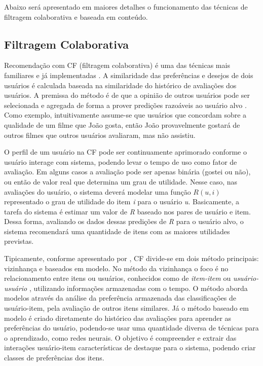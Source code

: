 Abaixo será apresentado em maiores detalhes o funcionamento das técnicas de filtragem colaborativa e baseada em conteúdo.

\subsection{Filtragem Colaborativa}

Recomendação com CF (filtragem colaborativa) é uma das técnicas mais familiares e já implementadas \citep{Ricci2011}. A similaridade das preferências e desejos de dois usuários é calculada baseada na similaridade do histórico de avaliações dos usuários. A premissa do método é de que a opinião de outros usuários pode ser selecionada e agregada de forma a prover predições razoáveis ao usuário alvo \citep{HCI-009}. Como exemplo, intuitivamente assume-se que usuários que concordam sobre a qualidade de um filme que João gosta, então João provavelmente gostará de outros filmes que outros usuários avaliaram, mas não assistiu.

O perfil de um usuário na CF pode ser continuamente aprimorado conforme o usuário interage com sistema, podendo levar o tempo de uso como fator de avaliação. Em alguns casos a avaliação pode ser apenas binária (gostei ou não), ou então de valor real que determina um grau de utilidade. Nesse caso, nas avaliações do usuário, o sistema deverá modelar uma função $R(u,i)$ representado o grau de utilidade do item \textit{i} para o usuário \textit{u}.  Basicamente, a tarefa do sistema é estimar um valor de \textit{R} baseado nos pares de usuário e item. Dessa forma, avaliando os dados dessas predições de \textit{R} para o usuário alvo, o sistema recomendará uma quantidade de itens com as maiores utilidades previstas.

Tipicamente, conforme apresentado por \cite{Burke:2002:HRS:586321.586352}, CF divide-se em dois método principais: vizinhança e baseados em modelo. No método da vizinhança o foco é no relacionamento entre itens ou usuários, conhecidos como de \textit{item-item} ou \textit{usuário-usuário} \citep{Ricci2011}, utilizando informações armazenadas com o tempo. O método aborda modelos através da análise da preferência armazenada das classificações de usuário-item, pela avaliação de outros itens similares. Já o método baseado em modelo é criado diretamente do histórico das avaliações para aprender as preferências do usuário, podendo-se usar uma quantidade diversa de técnicas para o aprendizado, como redes neurais. O objetivo é compreender e extrair das interações usuário-item características de destaque para o sistema, podendo criar classes de preferências dos itens.

